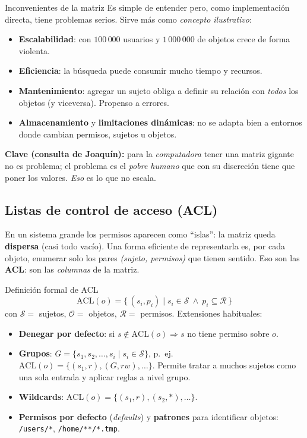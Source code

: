 \documentclass[11pt,a4paper]{article}
\newcommand{\Sset}{\mathcal{S}}
\newcommand{\Oset}{\mathcal{O}}
\newcommand{\Rset}{\mathcal{R}}
\begin{document}
\begin{warnbox}{Inconvenientes de la matriz}
Es simple de entender pero, como implementación directa, tiene problemas serios. Sirve más
como \emph{concepto ilustrativo}:
\begin{itemize}[leftmargin=1.4em,itemsep=1pt]
  \item \textbf{Escalabilidad}: con $100\,000$ usuarios y $1\,000\,000$ de objetos crece de
        forma violenta.
  \item \textbf{Eficiencia}: la búsqueda puede consumir mucho tiempo y recursos.
  \item \textbf{Mantenimiento}: agregar un sujeto obliga a definir su relación con \emph{todos}
        los objetos (y viceversa). Propenso a errores.
  \item \textbf{Almacenamiento} y \textbf{limitaciones dinámicas}: no se adapta bien a entornos
        donde cambian permisos, sujetos u objetos.
\end{itemize}
\textbf{Clave (consulta de Joaquín):} para la \emph{computadora} tener una matriz gigante no
es problema; el problema es el \emph{pobre humano} que con su discreción tiene que poner los
valores. \emph{Eso} es lo que no escala.
\end{warnbox}

\subsection{Listas de control de acceso (ACL)}
En un sistema grande los permisos aparecen como ``islas'': la matriz queda \textbf{dispersa}
(casi todo vacío). Una forma eficiente de representarla es, por cada objeto, enumerar solo los
pares \emph{(sujeto, permisos)} que tienen sentido. Eso son las \textbf{ACL}: son las
\emph{columnas} de la matriz.

\begin{defbox}{Definición formal de ACL}
\[
  \mathrm{ACL}(o) = \{\, (s_i, p_i) \mid s_i \in \Sset \ \wedge\ p_i \subseteq \Rset \,\}
\]
con $\Sset=$ sujetos, $\Oset=$ objetos, $\Rset=$ permisos. Extensiones habituales:
\begin{itemize}[leftmargin=1.4em,itemsep=1pt]
  \item \textbf{Denegar por defecto}: si $s\notin\mathrm{ACL}(o)\Rightarrow s$ no tiene
        permiso sobre $o$.
  \item \textbf{Grupos}: $G=\{s_1,s_2,\dots,s_i \mid s_i\in\Sset\}$, p.\ ej.\
        $\mathrm{ACL}(o)=\{(s_1,r),(G,rw),\dots\}$. Permite tratar a muchos sujetos como una
        sola entrada y aplicar reglas a nivel grupo.
  \item \textbf{Wildcards}: $\mathrm{ACL}(o)=\{(s_1,r),(s_2,\ast),\dots\}$.
  \item \textbf{Permisos por defecto} (\emph{defaults}) y \textbf{patrones} para identificar
        objetos: \texttt{/users/*}, \texttt{/home/**/*.tmp}.
\end{itemize}
\end{defbox}
\end{document}
